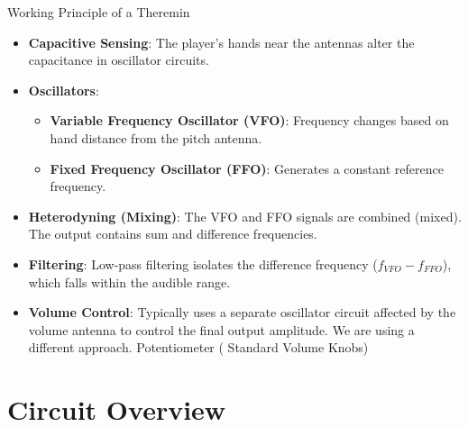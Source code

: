 \documentclass[10pt,xcolor={table,dvipsnames},t]{beamer}
\begin{document}
\begin{frame}{Working Principle of a Theremin}
\begin{itemize}
    \item \textbf{Capacitive Sensing}: The player's hands near the antennas alter the capacitance in oscillator circuits.
    \item \textbf{Oscillators}:
    \begin{itemize}
        \item \textbf{Variable Frequency Oscillator (VFO)}: Frequency changes based on hand distance from the pitch antenna.
        \item \textbf{Fixed Frequency Oscillator (FFO)}: Generates a constant reference frequency.
    \end{itemize}
    \item \textbf{Heterodyning (Mixing)}: The VFO and FFO signals are combined (mixed). The output contains sum and difference frequencies.
    \item \textbf{Filtering}: Low-pass filtering isolates the difference frequency ($f_{VFO} - f_{FFO}$), which falls within the audible range.
    \item \textbf{Volume Control}: Typically uses a separate oscillator circuit affected by the volume antenna to control the final output amplitude. We are using a different approach. Potentiometer ( Standard Volume Knobs)
\end{itemize}
\end{frame}

\section{Circuit Overview}
\end{document}
